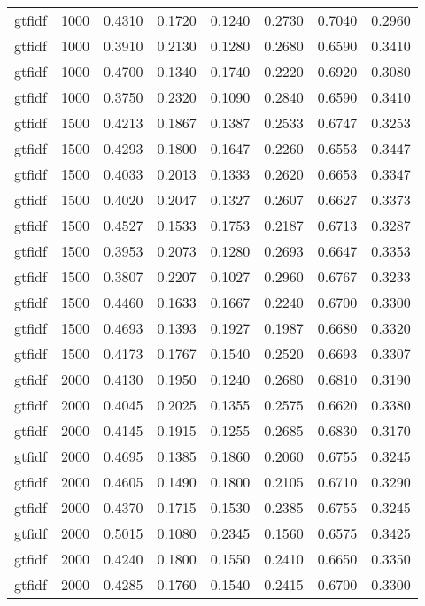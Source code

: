\begin{table}[h!]
\begin{tabularx}{\textwidth}{cccccccc}
		gtfidf   & 1000 & 0.4310 & 0.1720 & 0.1240 & 0.2730 & 0.7040 & 0.2960 \\
		gtfidf   & 1000 & 0.3910 & 0.2130 & 0.1280 & 0.2680 & 0.6590 & 0.3410 \\
		gtfidf   & 1000 & 0.4700 & 0.1340 & 0.1740 & 0.2220 & 0.6920 & 0.3080 \\
		gtfidf   & 1000 & 0.3750 & 0.2320 & 0.1090 & 0.2840 & 0.6590 & 0.3410 \\
		gtfidf   & 1500 & 0.4213 & 0.1867 & 0.1387 & 0.2533 & 0.6747 & 0.3253 \\
		gtfidf   & 1500 & 0.4293 & 0.1800 & 0.1647 & 0.2260 & 0.6553 & 0.3447 \\
		gtfidf   & 1500 & 0.4033 & 0.2013 & 0.1333 & 0.2620 & 0.6653 & 0.3347 \\
		gtfidf   & 1500 & 0.4020 & 0.2047 & 0.1327 & 0.2607 & 0.6627 & 0.3373 \\
		gtfidf   & 1500 & 0.4527 & 0.1533 & 0.1753 & 0.2187 & 0.6713 & 0.3287 \\
		gtfidf   & 1500 & 0.3953 & 0.2073 & 0.1280 & 0.2693 & 0.6647 & 0.3353 \\
		gtfidf   & 1500 & 0.3807 & 0.2207 & 0.1027 & 0.2960 & 0.6767 & 0.3233 \\
		gtfidf   & 1500 & 0.4460 & 0.1633 & 0.1667 & 0.2240 & 0.6700 & 0.3300 \\
		gtfidf   & 1500 & 0.4693 & 0.1393 & 0.1927 & 0.1987 & 0.6680 & 0.3320 \\
		gtfidf   & 1500 & 0.4173 & 0.1767 & 0.1540 & 0.2520 & 0.6693 & 0.3307 \\
		gtfidf   & 2000 & 0.4130 & 0.1950 & 0.1240 & 0.2680 & 0.6810 & 0.3190 \\
		gtfidf   & 2000 & 0.4045 & 0.2025 & 0.1355 & 0.2575 & 0.6620 & 0.3380 \\
		gtfidf   & 2000 & 0.4145 & 0.1915 & 0.1255 & 0.2685 & 0.6830 & 0.3170 \\
		gtfidf   & 2000 & 0.4695 & 0.1385 & 0.1860 & 0.2060 & 0.6755 & 0.3245 \\
		gtfidf   & 2000 & 0.4605 & 0.1490 & 0.1800 & 0.2105 & 0.6710 & 0.3290 \\
		gtfidf   & 2000 & 0.4370 & 0.1715 & 0.1530 & 0.2385 & 0.6755 & 0.3245 \\
		gtfidf   & 2000 & 0.5015 & 0.1080 & 0.2345 & 0.1560 & 0.6575 & 0.3425 \\
		gtfidf   & 2000 & 0.4240 & 0.1800 & 0.1550 & 0.2410 & 0.6650 & 0.3350 \\
		gtfidf   & 2000 & 0.4285 & 0.1760 & 0.1540 & 0.2415 & 0.6700 & 0.3300 \\

\end{tabularx}
\end{table}

